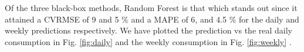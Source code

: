 \documentclass[10pt, conference, compsocconf]{IEEEtran}
\begin{document}
Of the three black-box methods, Random Forest is that which stands out since it attained a CVRMSE of 9 and 5 \%  and a MAPE of 6, and 4.5 \% for the daily and weekly predictions respectively. We have plotted the prediction vs the real daily consumption in Fig. \ref{fig:daily} and the weekly consumption in Fig. \ref{fig:weekly} .

\begin{center}
\end{center}




\end{document}
